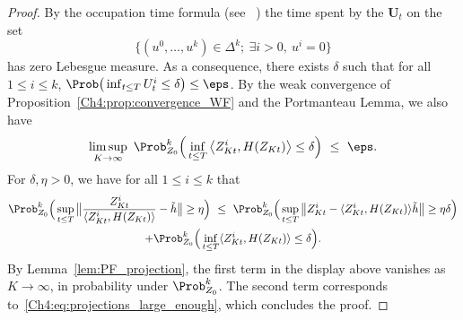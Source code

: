 \begin{refsegment}
\begin{proof}
By the occupation time formula (see \eg~\citet[Chapter XI, Proposition 1.5]{revuz_yor}) the time spent by the $\bm U_t$ on the set
\[
\big\{(u^0, \ldots,u^k)\in\Delta^k;\ \exists i>0,\ u^i=0\big\}
\]
has zero Lebesgue measure. As a consequence, there exists $\delta$ such that for all $ 1\leq i\leq k$, $\Prob\big( \inf_{t\leq T} U^i_t \leq \delta \big) \leq \eps$.
By the weak convergence of Proposition~\ref{Ch4:prop:convergence_WF} and the Portmanteau Lemma, we also have
\begin{equation}\label{Ch4:eq:projections_large_enough}
\limsup_{K\to\infty}\ \Prob^k_{Z_0}\Big(\inf_{t\leq T}\big\langle Z^i_{Kt}, H(Z_{Kt}) \big\rangle \leq \delta  \Big) \ \leq\ \eps.
\end{equation}
For $\delta, \eta >0$, we have for all $1\leq i\leq k$ that
\begin{multline*}
\Prob^k_{Z_0}\Big( \sup_{t\leq T}\big\lVert \frac{ Z^i_{Kt}}{\langle Z^i_{Kt}, H(Z_{Kt})\rangle}- \tilde h \big\rVert\geq \eta\Big)\ \leq\ \Prob^k_{Z_0}\Big( \sup_{t\leq T} \big\lVert  Z^i_{Kt}- \langle Z^i_{Kt}, H(Z_{Kt})\rangle \tilde h \big\rVert\geq \eta\delta \Big)\\
+ \Prob^k_{Z_0}\Big( \inf_{t\leq T} \langle Z^i_{Kt}, H(Z_{Kt})\rangle \leq \delta \Big).
\end{multline*}
By Lemma~\ref{lem:PF_projection}, the first term in the display above vanishes as $K\to\infty$, in probability under $\Prob^k_{Z_0}$. The second term corresponds to~\eqref{Ch4:eq:projections_large_enough}, which concludes the proof.
\end{proof}


\begin{singlespace}
\setlength{}
\small\printbibliography[  segment=\therefsegment,heading=subbibliography,title=References for Chapter~\ref{chp4_multitype}]
\end{singlespace}
\end{refsegment}
